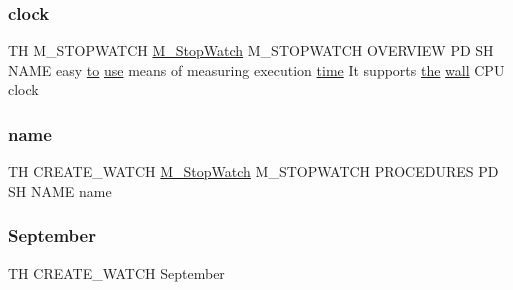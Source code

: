 \subsubsection{\texorpdfstring{clock}{clock}}
{\footnotesize\ttfamily TH M\+\_\+\+S\+T\+O\+P\+W\+A\+T\+CH \hyperlink{option__stopwatch_83_8txt_aa2011fc45a5e502e87ee50996a8a9305}{M\+\_\+\+Stop\+Watch} M\+\_\+\+S\+T\+O\+P\+W\+A\+T\+CH O\+V\+E\+R\+V\+I\+EW PD SH N\+A\+ME easy \hyperlink{M__stopwatch_83_8txt_a97209fd3e34ef701c0a9734280779cbb}{to} \hyperlink{intro__blas1_83_8txt_a04fa2694d85f67a675bb3f45f7241f48}{use} means of measuring execution \hyperlink{M__stopwatch_83_8txt_a1091fdf3a4e66042d1571c7e4ade98dd}{time} It supports \hyperlink{M__stopwatch_83_8txt_a0f266597de2e57eb3aa964927bb30e14}{the} \hyperlink{M__stopwatch_83_8txt_a78df39f546d66b02c203502a4025b0f4}{wall} C\+PU clock}

\mbox{\label{create__watch_83_8txt_a7952910b2b90c60662fb5b4a4e85427c}} 
\subsubsection{\texorpdfstring{name}{name}}
{\footnotesize\ttfamily TH C\+R\+E\+A\+T\+E\+\_\+\+W\+A\+T\+CH \hyperlink{option__stopwatch_83_8txt_aa2011fc45a5e502e87ee50996a8a9305}{M\+\_\+\+Stop\+Watch} M\+\_\+\+S\+T\+O\+P\+W\+A\+T\+CH P\+R\+O\+C\+E\+D\+U\+R\+ES PD SH N\+A\+ME name}

\mbox{\label{create__watch_83_8txt_a3f52c4f0a971d6aad8d5872fab85fac6}} 
\subsubsection{\texorpdfstring{September}{September}}
{\footnotesize\ttfamily TH C\+R\+E\+A\+T\+E\+\_\+\+W\+A\+T\+CH September}

